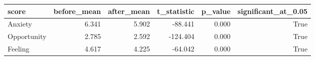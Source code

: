 \begin{tabular}{lrrrrr}
\toprule
score & before\_mean & after\_mean & t\_statistic & p\_value & significant\_at\_0.05 \\
\midrule
Anxiety & 6.341 & 5.902 & -88.441 & 0.000 & True \\
Opportunity & 2.785 & 2.592 & -124.404 & 0.000 & True \\
Feeling & 4.617 & 4.225 & -64.042 & 0.000 & True \\
\bottomrule
\end{tabular}
